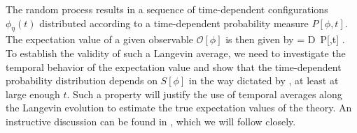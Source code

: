 \documentclass[../main.tex]{subfiles}
\begin{document}

The random process results in a sequence of time-dependent configurations $\phi_\eta(t)$ distributed according to a
time-dependent probability measure $P[\phi,t]$. The expectation value of a given observable $\mathcal O[\phi]$ is then
given by
%
\beq
  \label{Eq:EVOprob}
   = \int \mathcal D\phi\ P[\phi,t] \CO[\phi].
\eeq
%
To establish the validity of such a Langevin average, we need to investigate the temporal behavior of the expectation value and show that the time-dependent probability distribution depends on $S[\phi]$ in the way dictated by , at least at large enough $t$. 
Such a property will justify the use of temporal averages along the Langevin evolution to estimate the true expectation values of the theory.
An instructive discussion can be found in \cite{PTPS1993CLSimulation}, which we will follow closely.
\end{document}
